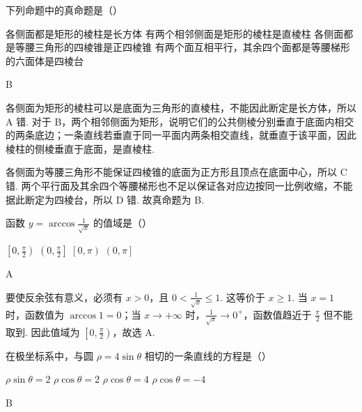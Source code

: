 \begin{problem}
下列命题中的真命题是（\quad）

\choices
    {各侧面都是矩形的棱柱是长方体}
    {有两个相邻侧面是矩形的棱柱是直棱柱}
    {各侧面都是等腰三角形的四棱锥是正四棱锥}
    {有两个面互相平行，其余四个面都是等腰梯形的六面体是四棱台}
\end{problem}

\begin{answer}
B
\end{answer}

\begin{solution}
各侧面为矩形的棱柱可以是底面为三角形的直棱柱，不能因此断定是长方体，所以 A 错. 对于 B，两个相邻侧面为矩形，说明它们的公共侧棱分别垂直于底面内相交的两条底边；一条直线若垂直于同一平面内两条相交直线，就垂直于该平面，因此棱柱的侧棱垂直于底面，是直棱柱.

各侧面为等腰三角形不能保证四棱锥的底面为正方形且顶点在底面中心，所以 C 错. 两个平行面及其余四个等腰梯形也不足以保证各对应边按同一比例收缩，不能据此断定为四棱台，所以 D 错. 故真命题为 B.
\end{solution}

\begin{problem}
函数 \(y = \arccos \frac{1}{\sqrt{x}}\) 的值域是（\quad）

\choices
    {\(\left[0,\frac{\pi}{2}\right)\)}
    {\(\left(0,\frac{\pi}{2}\right]\)}
    {\(\left[0,\pi\right)\)}
    {\(\left(0,\pi\right]\)}
\end{problem}

\begin{answer}
A
\end{answer}

\begin{solution}
要使反余弦有意义，必须有 \(x>0\)，且 \(0<\frac{1}{\sqrt{x}}\leqslant1\). 这等价于 \(x\geqslant1\). 当 \(x=1\) 时，函数值为 \(\arccos1=0\)；当 \(x\to+\infty\) 时，\(\frac{1}{\sqrt{x}}\to0^+\)，函数值趋近于 \(\frac{\pi}{2}\) 但不能取到. 因此值域为 \(\left[0,\frac{\pi}{2}\right)\)，故选 A.
\end{solution}

\begin{problem}
在极坐标系中，与圆 \(\rho = 4\sin \theta\) 相切的一条直线的方程是（\quad）

\choices
    {\(\rho \sin \theta = 2\)}
    {\(\rho \cos \theta = 2\)}
    {\(\rho \cos \theta = 4\)}
    {\(\rho \cos \theta = -4\)}
\end{problem}

\begin{answer}
B
\end{answer}

